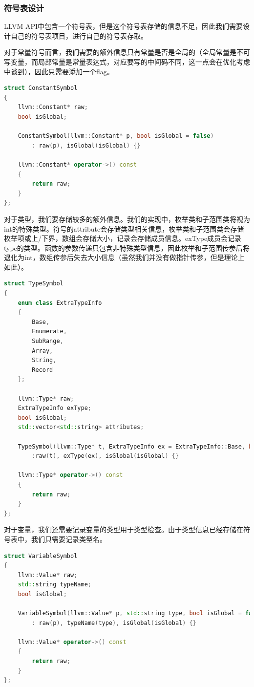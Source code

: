\documentclass{article}
\begin{document}
\subsubsection{符号表设计}
\par LLVM API中包含一个符号表，但是这个符号表存储的信息不足，因此我们需要设计自己的符号表项目，进行自己的符号表存取。
\par 对于常量符号而言，我们需要的额外信息只有常量是否是全局的（全局常量是不可写变量，而局部常量是常量表达式，对应要写的中间码不同，这一点会在优化考虑中谈到），因此只需要添加一个flag。
\begin{lstlisting}[language=C++]
struct ConstantSymbol
{
    llvm::Constant* raw;
    bool isGlobal;

    ConstantSymbol(llvm::Constant* p, bool isGlobal = false)
        : raw(p), isGlobal(isGlobal) {}

    llvm::Constant* operator->() const
    {
        return raw;
    }
};
\end{lstlisting}

\par 对于类型，我们要存储较多的额外信息。我们的实现中，枚举类和子范围类将视为int的特殊类型。符号的attribute会存储类型相关信息，枚举类和子范围类会存储枚举项或上/下界，数组会存储大小，记录会存储成员信息。exType成员会记录type的类型。函数的参数传递只包含非特殊类型信息，因此枚举和子范围传参后将退化为int，数组传参后失去大小信息（虽然我们并没有做指针传参，但是理论上如此）。
\begin{lstlisting}[language=C++]
struct TypeSymbol
{
    enum class ExtraTypeInfo
    {
        Base,
        Enumerate,
        SubRange,
        Array,
        String,
        Record
    };

    llvm::Type* raw;
    ExtraTypeInfo exType;
    bool isGlobal;
    std::vector<std::string> attributes;

    TypeSymbol(llvm::Type* t, ExtraTypeInfo ex = ExtraTypeInfo::Base, bool isGlobal = false)
        :raw(t), exType(ex), isGlobal(isGlobal) {}

    llvm::Type* operator->() const
    {
        return raw;
    }
};
\end{lstlisting}

\par 对于变量，我们还需要记录变量的类型用于类型检查。由于类型信息已经存储在符号表中，我们只需要记录类型名。
\begin{lstlisting}[language=C++]
struct VariableSymbol
{
    llvm::Value* raw;
    std::string typeName;
    bool isGlobal;

    VariableSymbol(llvm::Value* p, std::string type, bool isGlobal = false)
        : raw(p), typeName(type), isGlobal(isGlobal) {}

    llvm::Value* operator->() const
    {
        return raw;
    }
};
\end{lstlisting}
\end{document}
